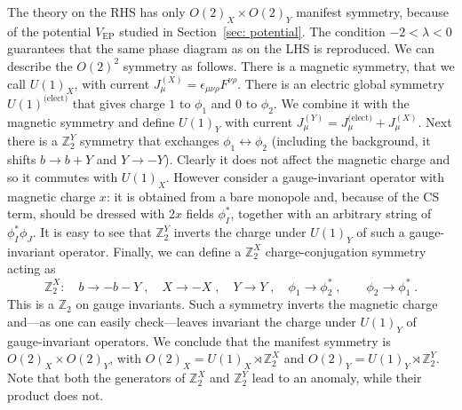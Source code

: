 \documentclass[a4paper, 12pt]{article}
\numberwithin{equation}{section}
\newcommand{\be}{\begin{equation}} \newcommand{\ee}{\end{equation}}
\newcommand{\bZ}{\mathbb{Z}}
\begin{document}
The theory on the RHS has only $O(2)_X \times O(2)_Y$ manifest symmetry, because of the potential $V_\text{EP}$ studied in Section~\ref{sec: potential}. The condition $-2<\lambda<0$ guarantees that the same phase diagram as on the LHS is reproduced. We can describe the $O(2)^2$ symmetry as follows. There is a magnetic symmetry, that we call $U(1)_X$, with current $J_\mu^{(X)} = \epsilon_{\mu\nu\rho}F^{\nu\rho}$. There is an electric global symmetry $U(1)^\text{(elect)}$ that gives charge $1$ to $\phi_1$ and $0$ to $\phi_2$. We combine it with the magnetic symmetry and define $U(1)_Y$ with current $J_\mu^{(Y)} = J_\mu^\text{(elect)} + J_\mu^{(X)}$. Next there is a $\bZ_2^Y$ symmetry that exchanges $\phi_1 \leftrightarrow \phi_2$ (including the background, it shifts $b \to b+Y$ and $Y \to -Y$). Clearly it does not affect the magnetic charge and so it commutes with $U(1)_X$. However consider a gauge-invariant operator with magnetic charge $x$: it is obtained from a bare monopole and, because of the CS term, should be dressed with $2x$ fields $\phi^*_I$, together with an arbitrary string of $\phi_I^* \phi^{\phantom{*}}_J$. It is easy to see that $\bZ_2^Y$ inverts the charge under $U(1)_Y$ of such a gauge-invariant operator. Finally, we can define a $\bZ_2^X$ charge-conjugation symmetry acting as
\be
\bZ_2^X:\quad b \to -b-Y \;,\quad X \to -X \;,\quad Y \to Y \;,\quad \phi_1 \to \phi_2^* \;,\qquad \phi_2 \to \phi_1^* \;.
\ee
This is a $\bZ_2$ on gauge invariants. Such a symmetry inverts the magnetic charge and---as one can easily check---leaves invariant the charge under $U(1)_Y$ of gauge-invariant operators. We conclude that the manifest symmetry is $O(2)_X \times O(2)_Y$, with $O(2)_X = U(1)_X \rtimes \bZ_2^X$ and $O(2)_Y = U(1)_Y \rtimes \bZ_2^Y$. Note that both the generators of $\bZ_2^X$ and $\bZ_2^Y$ lead to an anomaly, while their product does not.
\end{document}
